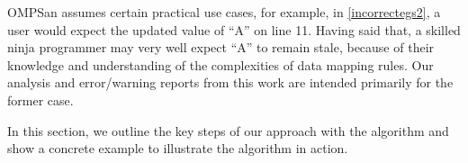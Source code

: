 % 
\vspace{-10pt}
OMPSan assumes certain practical use cases, for example, in \autoref{incorrectegs2}, 
a user would expect the updated 
value of ``A'' on line 11. 
Having said that, a skilled ninja programmer 
may very well expect ``A'' to remain stale, because of their knowledge 
and understanding of the complexities of data mapping rules. 
Our analysis and error/warning reports from this work are 
intended primarily for the former case.

In this section, we outline the key steps of our approach with the algorithm
and show a concrete example 
to illustrate the algorithm in action.
